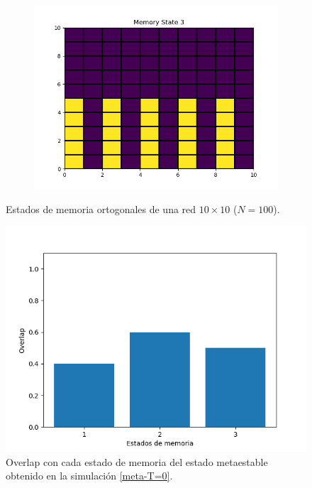 \documentclass[titlepage,12pt]{article}
\numberwithin{equation}{section}
\begin{document}
\begin{figure}
\begin{subfigure}{.3\textwidth}
	    \includegraphics[width=\linewidth]{state_10x10_3.png}
	    \end{subfigure}%
	    \caption{Estados de memoria ortogonales de una red $10 \times 10$ ($N = 100$).}
	    \label{ortogonal-states}
	\end{figure}
	\begin{figure}
	    \centering
	    \includegraphics[width=.45\linewidth]{Metastable_overlap.png}
	    \caption{Overlap con cada estado de memoria del estado metaestable obtenido en la simulación \ref{meta-T=0}.}
	    \label{meta-overlap}
	\end{figure}
	\newpage
\end{document}
